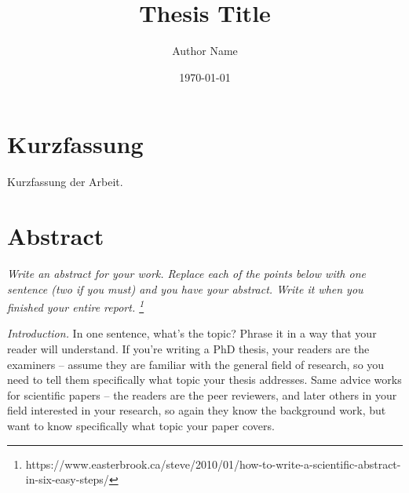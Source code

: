 \raggedbottom

\title{Thesis Title}
\author{Author Name}
\date{\today}
\maketitle

\pagestyle{scrheadings}

\chapter*{Kurzfassung}
\begin{otherlanguage}{ngerman}
  Kurzfassung der Arbeit.
\end{otherlanguage}
\clearpage

\chapter*{Abstract}
\emph{Write an abstract for your work.
  Replace each of the points below with one sentence (two if you must) and you have your abstract.
  Write it when you finished your entire report.%
  \footnote{https://www.easterbrook.ca/steve/2010/01/how-to-write-a-scientific-abstract-in-six-easy-steps/}}

\emph{Introduction.}
In one sentence, what’s the topic?
Phrase it in a way that your reader will understand.
If you’re writing a PhD thesis, your readers are the examiners – assume they are familiar with the general field of research, so you need to tell them specifically what topic your thesis addresses.
Same advice works for scientific papers – the readers are the peer reviewers, and later others in your field interested in your research, so again they know the background work, but want to know specifically what topic your paper covers.

